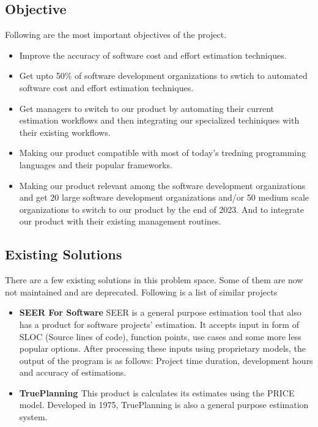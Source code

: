 \subsection{Objective}
Following are the most important objectives of the project.
\begin{itemize}
	\item Improve the accuracy of software cost and effort estimation techniques.
	\item Get upto 50\% of software development organizations to swtich to automated software cost and effort estimation techniques.
	\item Get managers to switch to our product by automating their current estimation workflows and then  integrating our specialized techiniques with their existing workflows.
	\item Making our product compatible with most of today's tredning programming languages and their popular frameworks.
	\item Making our product relevant among the software development organizations and get 20 large software development organizations and/or 50 medium scale organizations to switch to our product by the end of 2023. And to integrate our product with their existing management routines.
\end{itemize}













\subsection{Existing Solutions}
There are a few existing solutions in this problem space. Some of them are now not maintained and are deprecated. Following is a list of similar projects
\begin{itemize}
	\item {\bf{SEER For Software}}\newline
	SEER is a general purpose estimation tool that also has a product for software projects' estimation. It accepts input in form of SLOC (Source lines of code), function points, use cases and some more less popular options. After processing these inputs using proprietary models, the output of the program is as follows: Project time duration, development hours and accuracy of estimations.

	\item {\bf{TruePlanning \small{\textregistered}}}\newline
	This product is calculates its estimates using the PRICE model. Developed in 1975, TruePlanning is also a general purpose estimation system.
	
\end{itemize}














